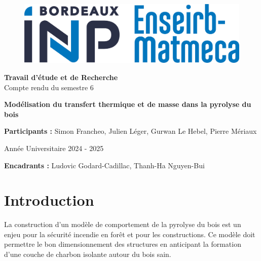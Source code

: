 \documentclass[a4paper,11pt]{article}
\begin{document}
\begin{titlepage}
    \begin{figure}
        \includegraphics[width=0.4\linewidth]{images/logo_em.jpg}
    \end{figure}
    \begin{center}
        \vspace*{3.5cm}


        \huge \textbf{Travail d'étude et de Recherche} \\
        Compte rendu du semestre 6
        \vspace{1cm}

        \hrulefill
        
        \vspace{0.4cm}
        {\Huge \textbf{Modélisation du transfert thermique et de masse dans la pyrolyse du bois}} \\
        \vspace{0.25cm}
        \hrulefill

        \vspace{1cm}
        \normalsize
        
        \textbf{Participants :}
        Simon Francheo, Julien Léger, Gurwan Le Hebel, Pierre Mériaux
        \vspace{6cm}

        \Large Année Universitaire 2024 - 2025
        
        \vspace{2cm}
        
        
        \normalsize
        \textbf{Encadrants :}
        Ludovic Godard-Cadillac, Thanh-Ha Nguyen-Bui 

        \vfill
        
    \end{center}
\end{titlepage}

\newpage
\tableofcontents
\newpage

\pagestyle{fancy}
\fancyhead{}


\section{Introduction}
La construction d'un modèle de comportement de la pyrolyse du bois est un enjeu pour la sécurité incendie en forêt et pour les constructions. Ce modèle doit permettre le bon dimensionnement des structures en anticipant la formation d'une couche de charbon isolante autour du bois sain. 
\\
\end{document}
